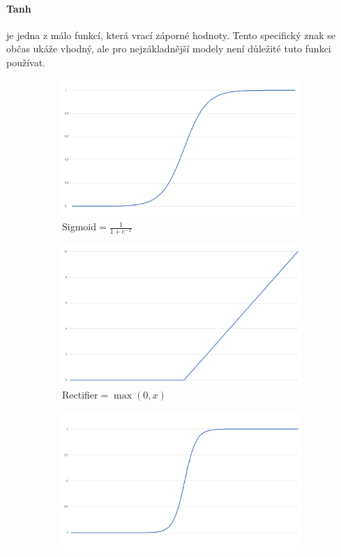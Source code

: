 \documentclass[12pt,a4paper]{report}
\begin{document}
		\paragraph{Tanh}
		je jedna z málo funkcí, která vrací záporné hodnoty. Tento specifický znak se občas ukáže vhodný, ale pro nejzákladnější modely není důležité tuto funkci používat.
		\begin{figure}
			\centering
			\begin{subfigure}[h]{0.3\textwidth}
				\includegraphics[width=\textwidth]{sigmoid}
				\caption{Sigmoid$=\frac{1}{1+e^{-x}}$}
				\label{fig:sigmoid}
			\end{subfigure}
			\begin{subfigure}[h]{0.3\textwidth}
				\includegraphics[width=\textwidth]{rectifier}
				\caption{Rectifier$=\max(0,x)$}
				\label{fig:rectifier}
			\end{subfigure}
			\begin{subfigure}[h]{0.3\textwidth}
				\includegraphics[width=\textwidth]{tanh}

\end{subfigure}
\end{figure}
\end{document}
